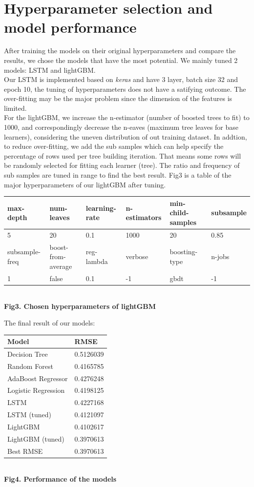 \documentclass{article}
\begin{document}
\section{Hyperparameter selection and model performance}
After training the models on their original hyperparameters and compare the results, we chose the models that have the most potential. We mainly tuned 2 models: LSTM and lightGBM.\\
Our LSTM is implemented based on \textit{keras} and  have 3 layer, batch size 32 and epoch 10, the tuning of hyperparameters does not have a satifying outcome. The over-fitting may be the major problem since the dimension of the features is limited.\\
For the lightGBM, we increase the n-estimator (number of boosted trees to fit) to 1000, and correspondingly decrease the n-eaves (maximum tree leaves for base learners), considering the uneven distribution of out training dataset. In addtion, to reduce over-fitting, we add the sub samples which can help specify the percentage of rows used per tree building iteration. That means some rows will be randomly selected for fitting each learner (tree). The ratio and frequency of sub samples are tuned in range to find the best result.  Fig3 is a table of the major hyperparameters of our lightGBM after tuning.\\
\begin{center} 
\centering
\begin{tabular}{|l|l|l|l|l|l|}
\hline 
max-depth&num-leaves&learning-rate&n-estimators&min-child-samples&subsample\\
\hline  
5 & 20 & 0.1 & 1000 & 20 & 0.85\\
\hline 
subsample-freq&boost-from-average&reg-lambda&verbose&boosting-type&n-jobs\\
\hline  
1 & false & 0.1 & -1 & gbdt & -1\\
\hline 
\end{tabular}\\
\textbf{Fig3. Chosen hyperparameters of lightGBM}\\
\end{center}

The final result of our models:

\begin{center} 
\centering
\begin{tabular}{ll}
\hline
Model & RMSE\\
\hline
Decision Tree & 0.5126039 \\
Random Forest & 0.4165785 \\
AdaBoost Regressor & 0.4276248 \\
Logistic Regression & 0.4198125 \\
LSTM & 0.4227168 \\
LSTM (tuned) & 0.4121097 \\
LightGBM & 0.4102617 \\
LightGBM (tuned) & 0.3970613 \\
Best RMSE & 0.3970613\\
\hline
\end{tabular}\\
\textbf{Fig4. Performance of the models}\\
\end{center}
\end{document}
